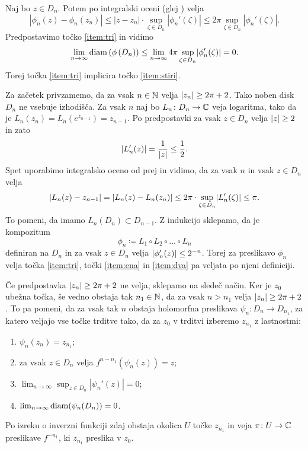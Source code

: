 \begin{dokaz}
    Naj bo \(z \in D_n\). Potem po integralski oceni (glej \cite[opomba na str.~233]{Globevnik_2010}) velja
    \begin{equation}
        |\phi_n (z) - \phi_n (z_n)| \leq |z - z_n| \cdot \sup_{\zeta \in D_n} |\phi_n' (\zeta)| \leq 2 \pi \sup_{\zeta \in D_n} |\phi_n' (\zeta)|.
    \end{equation}
    Predpostavimo točko \ref{item:tri} in vidimo
    \[\lim_{n \to \infty} \diam \prt{\phi \prt{D_n}} \leq \lim_{n \to \infty} 4 \pi \sup_{\zeta \in D_n} \abs{\phi_n' (\zeta)} = 0.\]
    Torej točka \ref{item:tri} implicira točko \ref{item:stiri}.

    Za začetek privzamemo, da za vsak \(n \in \mathbb N\) velja \(\lvert z_n\rvert \geq 2 \pi + 2\). Tako noben disk \(D_n\) ne vsebuje izhodišča. Za vsak \(n\) naj bo \(L_n \colon D_n \to \mathbb C\) veja logaritma, tako da je \(L_n (z_n) = L_n (e^{z_{n - 1}}) = z_{n - 1}\). Po predpostavki za vsak \(z \in D_n\) velja \(\lvert z\rvert \geq 2\) in zato
    \[\lvert L_n' (z)\rvert = \frac{1}{\lvert z\rvert} \leq \frac{1}{2}.\]
    Spet uporabimo integralsko oceno od prej in vidimo, da za vsak \(n\) in vsak \(z \in D_n\) velja
    \[\lvert L_n (z) - z_{n - 1}\rvert = \lvert L_n (z) - L_n (z_n)\rvert \leq 2 \pi \cdot \sup_{\zeta \in D_n} \lvert L_n' (\zeta)\rvert \leq \pi.\]
    To pomeni, da imamo \(L_n (D_n) \subset D_{n - 1}\). Z indukcijo sklepamo, da je kompozitum
    \[\phi_n \coloneq L_1 \circ L_2 \circ \dots \circ L_n\]
    definiran na \(D_n\) in za vsak \(z \in D_n\) velja \(\lvert\phi_n' (z)\rvert \leq 2^{-n}\). Torej za preslikavo \(\phi_n\) velja točka \ref{item:tri}, točki \ref{item:ena} in \ref{item:dva} pa veljata po njeni definiciji.

    Če predpostavka \(\lvert z_n\rvert \geq 2 \pi + 2\) ne velja, sklepamo na sledeč način. Ker je \(z_0\) ubežna točka, še vedno obstaja tak \(n_1 \in \mathbb N\), da za vsak \(n > n_1\) velja \(\lvert z_n\rvert \geq 2 \pi + 2\). To pa pomeni, da za vsak tak \(n\) obstaja holomorfna preslikava \(\psi_n \colon D_n \to D_{n_1}\), za katero veljajo vse točke trditve tako, da za \(z_0\) v trditvi izberemo \(z_{n_1}\) z lastnostmi:
    \begin{enumerate}
        \item \(\psi_n (z_n) = z_{n_1}\);
        \item za vsak \(z \in D_n\) velja \(f^{n - n_1} (\psi_n (z)) = z\);
        \item \(\lim_{n \to \infty} \sup_{z \in D_n} |\psi_n' (z)| = 0\);
        \item \(\lim_{n \to \infty} \operatorname{diam} (\psi_n (D_n)) = 0\).
    \end{enumerate}
    Po izreku o inverzni funkciji zdaj obstaja okolica \(U\) točke \(z_{n_1}\) in veja \(\pi \colon U \to \mathbb C\) preslikave \(f^{- n_1}\), ki \(z_{n_1}\) preslika v \(z_0\).


\end{dokaz}
